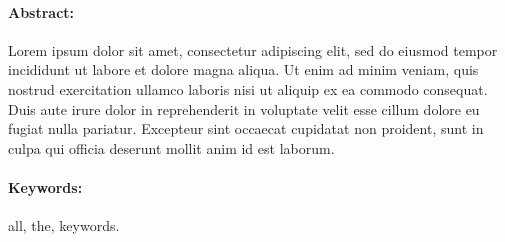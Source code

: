 
\maketitle

\let\oldthefootnote\thefootnote
\renewcommand{\thefootnote}{\fnsymbol{footnote}}


\let\thefootnote\oldthefootnote

\noindent
\paragraph{Abstract:}

Lorem ipsum dolor sit amet, consectetur adipiscing elit, sed do eiusmod tempor incididunt ut labore et dolore magna aliqua. Ut enim ad minim veniam, quis nostrud exercitation ullamco laboris nisi ut aliquip ex ea commodo consequat. Duis aute irure dolor in reprehenderit in voluptate velit esse cillum dolore eu fugiat nulla pariatur. Excepteur sint occaecat cupidatat non proident, sunt in culpa qui officia deserunt mollit anim id est laborum.

\noindent
\paragraph{Keywords:} all, the, keywords.

